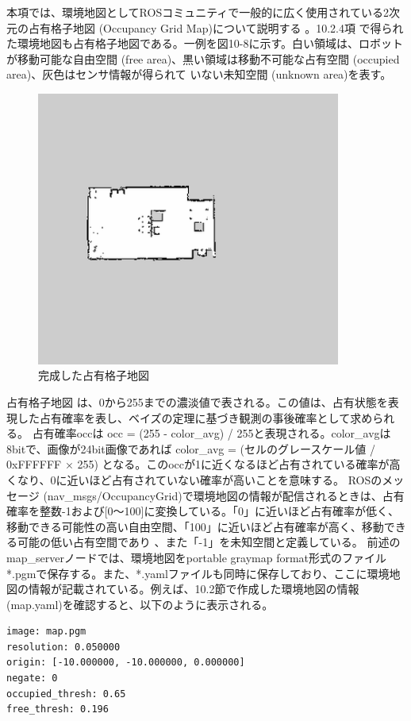 本項では、環境地図としてROSコミュニティで一般的に広く使用されている2次元の占有格子地図 (Occupancy Grid Map)について説明する  。10.2.4項  で得られた環境地図も占有格子地図である。一例を図10-8に示す。白い領域は、ロボットが移動可能な自由空間 (free area)、黒い領域は移動不可能な占有空間 (occupied area)、灰色はセンサ情報が得られて  いない未知空間 (unknown area)を表す。

\begin{figure}[htp]
  \centering
  \includegraphics[width=10cm]{pictures/chapter10/pic_10_08.png}
  \caption{完成した占有格子地図}
\end{figure}

占有格子地図  は、0から255までの濃淡値で表される。この値は、占有状態を表現した占有確率を表し、ベイズの定理に基づき観測の事後確率として求められる。  占有確率occは occ = (255 - color\_avg) / 255と表現される。color\_avgは8bitで、画像が24bit画像であれば color\_avg = (セルのグレースケール値 / 0xFFFFFF × 255) となる。このoccが1に近くなるほど占有されている確率が高くなり、0に近いほど占有されていない確率が高いことを意味する。
ROSのメッセージ (nav\_msgs/OccupancyGrid)で環境地図の情報が配信されるときは、占有確率を整数-1および[0〜100]に変換している。「0」に近いほど占有確率が低く、移動できる可能性の高い自由空間、「100」に近いほど占有確率が高く、移動できる可能の低い占有空間であり  、また「-1」を未知空間と定義している。
前述のmap\_serverノードでは、環境地図をportable graymap format形式のファイル*.pgmで保存する。また、*.yamlファイルも同時に保存しており、ここに環境地図の情報が記載されている。例えば、10.2節で作成した環境地図の情報(map.yaml)を確認すると、以下のように表示される。

\begin{lstlisting}[language=ROS]
image: map.pgm
resolution: 0.050000
origin: [-10.000000, -10.000000, 0.000000]
negate: 0
occupied_thresh: 0.65
free_thresh: 0.196
\end{lstlisting}

